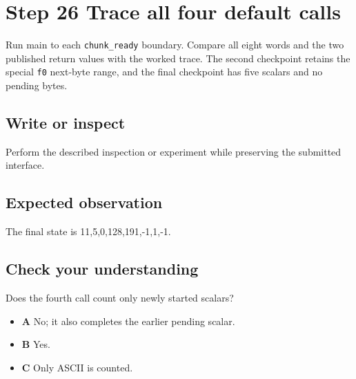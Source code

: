 \section{Step 26 Trace all four default calls}\label{utf8-s26}

Run main to each \texttt{chunk\_ready} boundary. Compare all eight words and the two published return values with the worked trace. The second checkpoint retains the special \texttt{f0} next-byte range, and the final checkpoint has five scalars and no pending bytes.

\subsection{Write or inspect}
Perform the described inspection or experiment while preserving the submitted interface.

\subsection{Expected observation}
The final state is 11,5,0,128,191,-1,1,-1.

\subsection{Check your understanding}
Does the fourth call count only newly started scalars?

\begin{itemize}
  \item \textbf{A} No; it also completes the earlier pending scalar.
  \item \textbf{B} Yes.
  \item \textbf{C} Only ASCII is counted.
\end{itemize}
